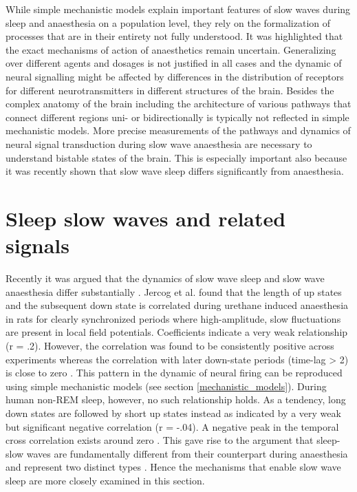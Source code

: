 While simple mechanistic models explain important features of slow waves during sleep and anaesthesia on a population level, they rely on the formalization of processes that are in their entirety not fully understood. It was highlighted that the exact mechanisms of action of anaesthetics remain uncertain. Generalizing over different agents and dosages is not justified in all cases and the dynamic of neural signalling might be affected by differences in the distribution of receptors for different neurotransmitters in different structures of the brain. Besides the complex anatomy of the brain including the architecture of various pathways that connect different regions uni- or bidirectionally is typically not reflected in simple mechanistic models. More precise measurements of the pathways and dynamics of neural signal transduction during slow wave anaesthesia are necessary to understand bistable states of the brain. This is especially important also because it was recently shown that slow wave sleep differs significantly from anaesthesia.
\section{Sleep slow waves and related signals}
\label{slow_waves_anaesthesia_sleep}
Recently it was argued that the dynamics of slow wave sleep and slow wave anaesthesia differ substantially \parencite{nghiem2018two}. Jercog et al. \parencite*{jercog2017up} found that the length of up states and the subsequent down state is correlated during urethane induced anaesthesia in rats for clearly synchronized periods where high-amplitude, slow fluctuations are present in local field potentials. Coefficients indicate a very weak relationship (r = .2). However, the correlation was found to be consistently positive across experiments whereas the correlation with later down-state periods (time-lag > 2) is close to zero \parencite{jercog2017up}. This pattern in the dynamic of neural firing can be reproduced using simple mechanistic models (see section \ref{mechanistic_models}). During human non-REM sleep, however, no such relationship holds. As a tendency, long down states are followed by short up states instead as indicated by a very weak but significant negative correlation (r = -.04). A negative peak in the temporal cross correlation exists around zero \parencite{nghiem2018two}. This gave rise to the argument that sleep-slow waves are fundamentally different from their counterpart during anaesthesia and represent two distinct types \parencite{nghiem2018two}. Hence the mechanisms that enable slow wave sleep are more closely examined in this section. \\

